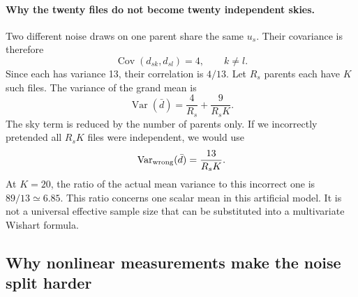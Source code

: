 \documentclass[11pt]{article}
\newcommand{\Var}{\operatorname{Var}}
\newcommand{\cov}{\operatorname{Cov}}
\begin{document}
\paragraph{Why the twenty files do not become twenty independent skies.}
Two different noise draws on one parent share the same $u_s$. Their
covariance is therefore
\begin{equation}
 \cov(d_{sk},d_{sl})=4,\qquad k\ne l.
\end{equation}
Since each has variance 13, their correlation is $4/13$. Let $R_s$ parents
each have $K$ such files. The variance of the grand mean is
\begin{equation}
 \Var(\bar d)=\frac4{R_s}+\frac9{R_sK}.
\end{equation}
The sky term is reduced by the number of parents only. If we incorrectly
pretended all $R_sK$ files were independent, we would use
\begin{equation}
 \Var_{\rm wrong}(\bar d)=\frac{13}{R_sK}.
\end{equation}
At $K=20$, the ratio of the actual mean variance to this incorrect one is
$89/13\simeq6.85$. This ratio concerns one scalar mean in this artificial
model. It is not a universal effective sample size that can be substituted
into a multivariate Wishart formula.

\subsection{Why nonlinear measurements make the noise split harder}
\end{document}
